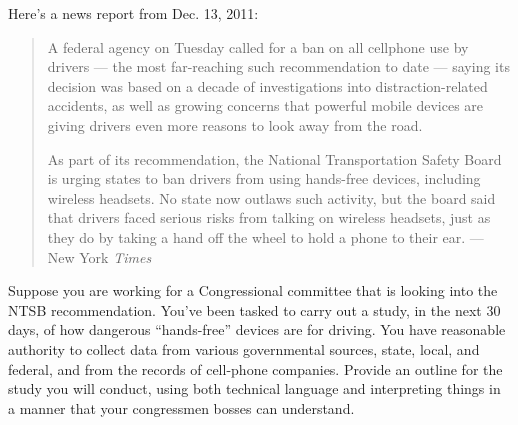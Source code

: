 
Here's a news report from Dec. 13, 2011:
\begin{quotation}
A federal agency on Tuesday called for a ban on all cellphone use by drivers --- the most far-reaching such recommendation to date --- saying its decision was based on a decade of investigations into distraction-related accidents, as well as growing concerns that powerful mobile devices are giving drivers even more reasons to look away from the road.

As part of its recommendation, the National Transportation Safety Board is urging states to ban drivers from using hands-free devices, including wireless headsets. No state now outlaws such activity, but the board said that drivers faced serious risks from talking on wireless headsets, just as they do by taking a hand off the wheel to hold a phone to their ear.  --- New York {\em Times}
\end{quotation}

Suppose you are working for a Congressional committee that is looking into the NTSB recommendation.  You've been tasked to carry out a study, in the next 30 days, of how dangerous ``hands-free'' devices are for driving.  You have reasonable authority to collect data from various governmental sources, state, local, and federal, and from the records of cell-phone companies.  Provide an outline for the study you will conduct, using both technical language and interpreting things in a manner that your congressmen bosses can understand.

\TextEntry
